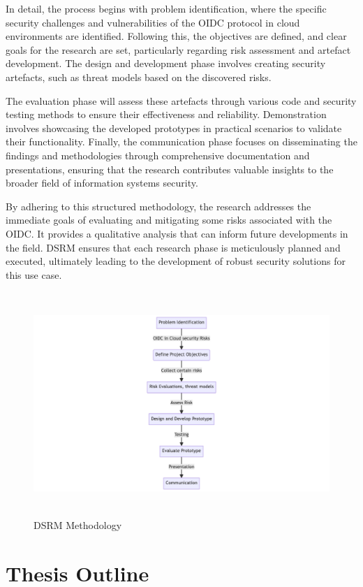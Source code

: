 In detail, the process begins with problem identification, where the specific security challenges and vulnerabilities of the OIDC protocol in cloud environments are identified. Following this, the objectives are defined, and clear goals for the research are set, particularly regarding risk assessment and artefact development. The design and development phase involves creating security artefacts, such as threat models based on the discovered risks.

The evaluation phase will assess these artefacts through various code and security testing methods to ensure their effectiveness and reliability. Demonstration involves showcasing the developed prototypes in practical scenarios to validate their functionality. Finally, the communication phase focuses on disseminating the findings and methodologies through comprehensive documentation and presentations, ensuring that the research contributes valuable insights to the broader field of information systems security.

By adhering to this structured methodology, the research addresses the immediate goals of evaluating and mitigating some risks associated with the OIDC. It provides a qualitative analysis that can inform future developments in the field. DSRM ensures that each research phase is meticulously planned and executed, ultimately leading to the development of robust security solutions for this use case.

\begin{figure}[h!]
\centering
\caption{DSRM Methodology}\label{fig:dsrm}
\includegraphics[width=\textwidth, height=320px]{pics/dsrm.png}
\end{figure}

\section{Thesis Outline}

